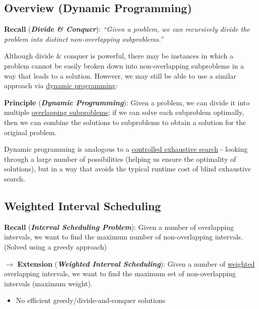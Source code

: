 \documentclass[12pt]{extarticle}
\theoremstyle{definition}
\theoremstyle{remark}
\newcommand{\probname}[1]{\noindent \textbf{\textit{#1}}}
\begin{document}
\subsection*{Overview (Dynamic Programming)}
\begin{center}
    \textbf{Recall} (\textbf{\textit{Divide \& Conquer}}): \textit{``Given a problem, we can recursively divide the problem into distinct non-overlapping subproblems.''}
\end{center}

Although divide \& conquer is powerful, there may be instances in which a problem cannot be easily broken down into non-overlapping subproblems in a way that leads to a solution. However, we may still be able to use a similar approach via \ul{dynamic programming}:

\begin{center}
    \textbf{Principle} (\textbf{\textit{Dynamic Programming}}): Given a problem, we can divide it into multiple \ul{overlapping subproblems}; if we can solve each subproblem optimally, then we can combine the solutions to subproblems to obtain a solution for the original problem.
\end{center}

\noindent Dynamic programming is analogous to a \ul{controlled exhaustive search} - looking through a large number of possibilities (helping us ensure the optimality of solutions), but in a way that avoids the typical runtime cost of blind exhaustive search.

\subsection{Weighted Interval Scheduling}
\noindent\textbf{Recall} (\probname{Interval Scheduling Problem}): Given a number of overlapping intervals, we want to find the maximum number of non-overlapping intervals. (Solved using a greedy approach)

\vspace{10pt}
\noindent$\rightarrow$ \textbf{Extension} (\probname{Weighted Interval Scheduling}): Given a number of \ul{weighted} overlapping intervals, we want to find the maximum set of non-overlapping intervals (maximum weight).
\begin{itemize}
    \item No efficient greedy/divide-and-conquer solutions
\end{itemize}

\begin{center}
\end{center}
\end{document}
